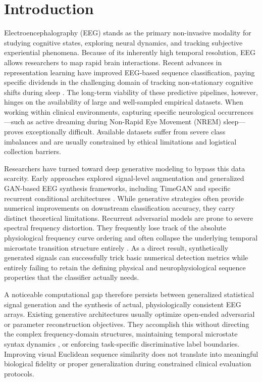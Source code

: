 \documentclass[journal,10pt,twocolumn]{IEEEtran}
\begin{document}
\section{Introduction}

Electroencephalography (EEG) stands as the primary non-invasive modality for studying cognitive states, exploring neural dynamics, and tracking subjective experiential phenomena. Because of its inherently high temporal resolution, EEG allows researchers to map rapid brain interactions. Recent advances in representation learning have improved EEG-based sequence classification, paying specific dividends in the challenging domain of tracking non-stationary cognitive shifts during sleep \cite{siclari2018dreaming}. The long-term viability of these predictive pipelines, however, hinges on the availability of large and well-sampled empirical datasets. When working within clinical environments, capturing specific neurological occurrences—such as active dreaming during Non-Rapid Eye Movement (NREM) sleep—proves exceptionally difficult. Available datasets suffer from severe class imbalances and are usually constrained by ethical limitations and logistical collection barriers. 

Researchers have turned toward deep generative modeling to bypass this data scarcity. Early approaches explored signal-level augmentation and generalized GAN-based EEG synthesis frameworks, including TimeGAN \cite{yoon2019time} and specific recurrent conditional architectures \cite{vahid2022conditional}. While generative strategies often provide numerical improvements on downstream classification accuracy, they carry distinct theoretical limitations. Recurrent adversarial models are prone to severe spectral frequency distortion. They frequently lose track of the absolute physiological frequency curve ordering and often collapse the underlying temporal microstate transition structure entirely \cite{habashi2023generative}. As a direct result, synthetically generated signals can successfully trick basic numerical detection metrics while entirely failing to retain the defining physical and neurophysiological sequence properties that the classifier actually needs.

A noticeable computational gap therefore persists between generalized statistical signal generation and the synthesis of actual, physiologically consistent EEG arrays. Existing generative architectures usually optimize open-ended adversarial or parameter reconstruction objectives. They accomplish this without directing the complex frequency-domain structures, maintaining temporal microstate syntax dynamics \cite{diezig2024eeg, tarailis2024functional}, or enforcing task-specific discriminative label boundaries. Improving visual Euclidean sequence similarity does not translate into meaningful biological fidelity or proper generalization during constrained clinical evaluation protocols.
\end{document}
